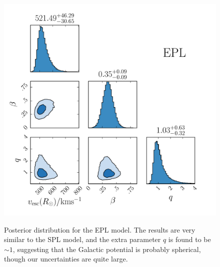\documentclass[useAMS,twocolumn,usenatbib]{mn2e}
\begin{document}
\begin{figure}
\includegraphics[width=\columnwidth]{plots/corner_flattened_powerlaw}\\
\caption{Posterior distribution for the EPL model. The results are 
very similar to the SPL model, and the extra parameter $q$ is found to 
be $\sim 1$, suggesting that the Galactic potential is probably spherical, 
though our uncertainties are quite large.}
\label{fig:EPL_posterior}
\end{figure}
\end{document}
